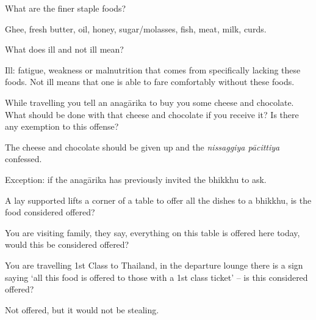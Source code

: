 \bigskip

What are the finer staple foods?

\begin{solution}
  Ghee, fresh butter, oil, honey, sugar/molasses, fish, meat, milk, curds.
\end{solution}

\bigskip

What does ill and not ill mean?

\begin{solution}
  Ill: fatigue, weakness or malnutrition that comes from specifically lacking
  these foods. Not ill means that one is able to fare comfortably without these
  foods.
\end{solution}

\bigskip

While travelling you tell an anagārika to buy you some cheese and chocolate.
What should be done with that cheese and chocolate if you receive it? Is there
any exemption to this offense?

\begin{solution}
  The cheese and chocolate should be given up and the \emph{nissaggiya pācittiya} confessed.

  Exception: if the anagārika has previously invited the bhikkhu to ask.
\end{solution}

\bigskip


A lay supported lifts a corner of a table to offer all the dishes to a bhikkhu,
is the food considered offered?

\bigskip

You are visiting family, they say, everything on this table is offered here
today, would this be considered offered?

\bigskip

You are travelling 1st Class to Thailand, in the departure lounge there is a
sign saying ‘all this food is offered to those with a 1st class ticket’ – is
this considered offered?

\begin{solution}
  Not offered, but it would not be stealing.
\end{solution}

\bigskip

